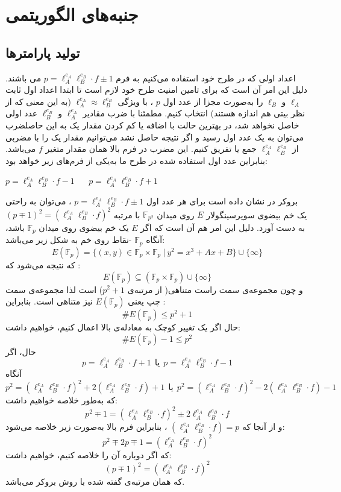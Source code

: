 
\section{جنبه‌های الگوریتمی}\label{algorithm_aspect}

\subsection{ تولید پارامترها}\label{parameter_generate}

 اعداد اولی که در طرح خود استفاده می‌کنیم به فرم 
$p = \ell_A^{e_A} \ell_B^{e_B} \cdot f \pm 1$
می باشند. دلیل این امر آن است که برای تامین امنیت طرح خود لازم است تا ابتدا اعداد اول ثابت  
$\ell_A$
و
$\ell_B$
را به‌صورت مجزا از عدد اول
$p$
، با ویژگی 
$\ell_A^{e_A} \approx \ell_B^{e_B}$ 
(به این معنی که از نظر بیتی هم اندازه هستند)
انتخاب کنیم. مطمئنا با ضرب مقادیر 
$\ell_A^{e_A}$
و
$\ell_B^{e_B}$
عدد اولی خاصل نخواهد شد، در بهترین حالت با اضافه یا کم کردن مقدار یک به این حاصلضرب می‌توان به یک عدد اول رسید و اگر نتیجه حاصل نشد می‌توانیم مقدار یک را با مضربی از 
$ \ell_A^{e_A} \ell_B^{e_B} $
جمع یا تفریق کنیم. این مضرب در فرم بالا همان مقدار متغیر
$f$
می‌باشد. بنابراین عدد اول استفاده شده در طرح ما به‌یکی از فرم‌های زیر خواهد بود: 
\begin{center}
	$p = \ell_A^{e_A} \ell_B^{e_B} \cdot f - 1$~
	~
	$p = \ell_A^{e_A} \ell_B^{e_B} \cdot f + 1$
\end{center}

بروکر در
\cite{broker}
نشان داده است برای هر عدد اول 
$p = \ell_A^{e_A} \ell_B^{e_B} \cdot f \pm 1$
، می‌توان به راحتی یک خم بیضوی سوپرسینگولار 
$E$
روی میدان
$\mathbb{F}_{p^2}$
با مرتبه 
$({p \mp 1})^2 = (\ell_A^{e_A} \ell_B^{e_B} \cdot f)^2$
به دست آورد. دلیل این امر هم آن است که اگر
$E$
یک خم بیضوی روی میدان 
$\mathbb{F}_p$
باشد، آنگاه 
$\mathbb{F}_p$
-نقاط روی خم به شکل زیر می‌باشد:
$$ E(\mathbb{F}_p) = \{ (x,y) \in \mathbb{F}_p \times \mathbb{F}_p ~ | ~ y^2 = x^3+Ax+B \} \cup \{ \infty \}$$
که نتیجه می‌شود که :
$$ E(\mathbb{F}_p) \subseteq (\mathbb{F}_p \times \mathbb{F}_p) \cup \{ \infty \} $$
و چون مجموعه‌ی سمت راست متناهی( از مرتبه‌ی 
$p^2 + 1 $)
 است لذا مجموعه‌ی سمت چپ یعنی 
$E(\mathbb{F}_p)$
نیز متناهی است. بنابراین :
$$ \# E(\mathbb{F}_p) \leq p^2+1 $$
حال اگر یک تغییر کوچک به معادله‌ی بالا اعمال کنیم، خواهیم داشت:
$$ \# E(\mathbb{F}_p) - 1 \leq p^2 $$
حال، اگر 
$$
p = \ell_A^{e_A} \ell_B^{e_B} \cdot f + 1
~~ \text{یا} ~~
p = \ell_A^{e_A} \ell_B^{e_B} \cdot f - 1
$$
آنگاه
$$
p^2 = (\ell_A^{e_A} \ell_B^{e_B} \cdot f)^2 + 2 (\ell_A^{e_A} \ell_B^{e_B} \cdot f) + 1
~~ \text{یا} ~~
p^2 = (\ell_A^{e_A} \ell_B^{e_B} \cdot f)^2 - 2 (\ell_A^{e_A} \ell_B^{e_B} \cdot f) - 1
$$
که به‌طور خلاصه خواهیم داشت:
$$ p^2 \mp 1 = (\ell_A^{e_A} \ell_B^{e_B} \cdot f )^2 \pm 2 \ell_A^{e_A} \ell_B^{e_B} \cdot f   $$
و از آنجا که 
$ (\ell_A^{e_A} \ell_B^{e_B} \cdot f) = p $
، بنابراین فرم بالا به‌صورت زیر خلاصه می‌شود:
$$ p^2 \mp 2p \mp 1 = (\ell_A^{e_A} \ell_B^{e_B} \cdot f)^2 $$
که اگر دوباره آن‌ را خلاصه کنیم، خواهیم داشت:
$$ (p \mp 1)^2 = (\ell_A^{e_A} \ell_B^{e_B} \cdot f)^2 $$
که همان مرتبه‌ی گفته شده با روش بروکر می‌باشد.

